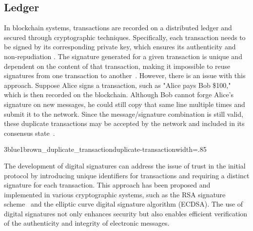 \subsection{Ledger}
In blockchain systems, transactions are recorded on a distributed ledger and secured through cryptographic techniques. Specifically, each
transaction needs to be signed by its corresponding private key, which ensures its authenticity and non-repudiation
\cite{stinson2018cryptography}. The signature generated for a given transaction is unique and dependent on the content of that transaction,
making it impossible to reuse signatures from one transaction to another~\cite{bruce1996applied}. However, there is an issue with this approach.
Suppose Alice signs a transaction, such as "Alice pays Bob \$100," which is then recorded on the blockchain. Although Bob cannot forge Alice's
signature on new messages, he could still copy that same line multiple times and submit it to the network. Since the message/signature combination
is still valid, these duplicate transactions may be accepted by the network and included in its consensus state~\cite{swan2015blockchain}.

{3blue1brown_duplicate_transaction}{duplicate-transaction}{width=.85\textwidth}%

The development of digital signatures can address the issue of trust in the initial protocol by introducing unique identifiers for transactions
and requiring a distinct signature for each transaction. This approach has been proposed and implemented in various cryptographic systems,
such as the RSA signature scheme~\cite{rivest1978method} and the elliptic curve digital signature algorithm (ECDSA). The use of digital
signatures not only enhances security but also enables efficient verification of the authenticity and integrity of electronic messages.


